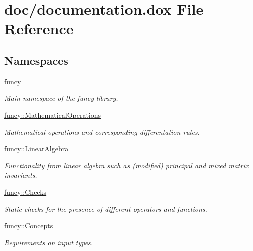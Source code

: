 \hypertarget{documentation_8dox}{\section{doc/documentation.dox File Reference}
\label{documentation_8dox}
}
\subsection*{Namespaces}
\begin{DoxyCompactItemize}
\item 
\hyperlink{namespacefuncy}{funcy}
\begin{DoxyCompactList}\small\item\em Main namespace of the funcy library. \end{DoxyCompactList}\item 
\hyperlink{namespacefuncy_1_1MathematicalOperations}{funcy\-::\-Mathematical\-Operations}
\begin{DoxyCompactList}\small\item\em Mathematical operations and corresponding differentation rules. \end{DoxyCompactList}\item 
\hyperlink{namespacefuncy_1_1LinearAlgebra}{funcy\-::\-Linear\-Algebra}
\begin{DoxyCompactList}\small\item\em Functionality from linear algebra such as (modified) principal and mixed matrix invariants. \end{DoxyCompactList}\item 
\hyperlink{namespacefuncy_1_1Checks}{funcy\-::\-Checks}
\begin{DoxyCompactList}\small\item\em Static checks for the presence of different operators and functions. \end{DoxyCompactList}\item 
\hyperlink{namespacefuncy_1_1Concepts}{funcy\-::\-Concepts}
\begin{DoxyCompactList}\small\item\em Requirements on input types. \end{DoxyCompactList}\end{DoxyCompactItemize}
